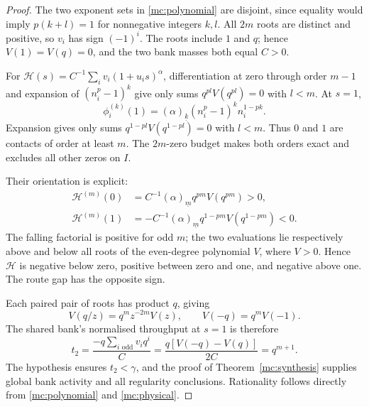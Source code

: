 \begin{proof}
The two exponent sets in \eqref{mc:polynomial} are disjoint, since equality would imply $p(k+l)=1$ for nonnegative integers $k,l$. All $2m$ roots are distinct and positive, so $v_i$ has sign $(-1)^i$. The roots include $1$ and $q$; hence $V(1)=V(q)=0$, and the two bank masses both equal $C>0$.

For $\mathcal H(s)=C^{-1}\sum_iv_i(1+u_is)^\alpha$, differentiation at zero through order $m-1$ and expansion of $(n_i^p-1)^k$ give only sums $q^{p l}V(q^{p l})=0$ with $l<m$. At $s=1$,
\begin{equation}
 \phi_i^{(k)}(1)=(\alpha)_{\underline{k}}(n_i^p-1)^kn_i^{1-pk}.
\end{equation}
Expansion gives only sums $q^{1-p l}V(q^{1-p l})=0$ with $l<m$. Thus $0$ and $1$ are contacts of order at least $m$. The $2m$-zero budget makes both orders exact and excludes all other zeros on $I$.

Their orientation is explicit:
\begin{align}
 \mathcal H^{(m)}(0)&=C^{-1}(\alpha)_{\underline m}q^{pm}V(q^{pm})>0,\nonumber\\
 \mathcal H^{(m)}(1)&=-C^{-1}(\alpha)_{\underline m}q^{1-pm}V(q^{1-pm})<0.\label{mc:doublesigns}
\end{align}
The falling factorial is positive for odd $m$; the two evaluations lie respectively above and below all roots of the even-degree polynomial $V$, where $V>0$. Hence $\mathcal H$ is negative below zero, positive between zero and one, and negative above one. The route gap has the opposite sign.

Each paired pair of roots has product $q$, giving
\begin{equation}
 V(q/z)=q^mz^{-2m}V(z),\qquad V(-q)=q^mV(-1).
\end{equation}
The shared bank's normalised throughput at $s=1$ is therefore
\begin{equation}
 t_2=\frac{-q\sum_{i\text{ odd}}v_iq^i}{C}
 =\frac{q[V(-q)-V(q)]}{2C}=q^{m+1}.
\end{equation}
The hypothesis ensures $t_2<\gamma$, and the proof of Theorem~\ref{mc:synthesis} supplies global bank activity and all regularity conclusions. Rationality follows directly from \eqref{mc:polynomial} and \eqref{mc:physical}.
\end{proof}


